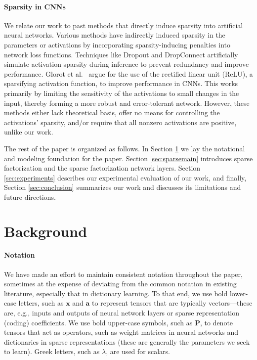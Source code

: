 \documentclass[10pt,twocolumn,letterpaper]{article}
\renewcommand{\vec}{\mathbf}
\newcommand{\x}{\vec{x}}
\renewcommand{\P}{\vec{P}}
\renewcommand{\a}{\vec{a}}
\begin{document}
\paragraph{Sparsity in CNNs}
%
We relate our work to past methods that directly induce sparsity into artificial neural networks.
%
Various methods \cite{SeNeurComp1997,NgICML2004,BoCuNIPS2008} have indirectly induced sparsity in the parameters or activations by incorporating sparsity-inducing penalties into network loss functions. Techniques like Dropout \cite{SrHiKrJMLR2014} and DropConnect \cite{WaZeZhICML2013} artificially simulate activation sparsity during inference to prevent redundancy and improve performance.
%
Glorot et al.~\cite{GlBoBeAIStats2011} argue for the use of the rectified linear unit (ReLU), a sparsifying activation function, to improve performance in CNNs. 
This works primarily by limiting the sensitivity of the activations to small changes in the input, thereby forming a more robust and error-tolerant network. However, these methods either lack theoretical basis, offer no means for controlling the activations' sparsity, and/or require that all nonzero activations are positive, unlike our work.
%

The rest of the paper is organized as follows.  In Section \ref{sec:background} we lay the notational and modeling foundation for the paper.  Section \ref{sec:sparsemain} introduces sparse factorization and the sparse factorization network layers.  Section \ref{sec:experiments} describes our experimental evaluation of our work, and finally, Section \ref{sec:conclusion} summarizes our work and discusses its limitations and future directions.

\section{Background}
\label{sec:background}

\paragraph{Notation}
%
We have made an effort to maintain consistent notation throughout the paper, sometimes at the expense of deviating from the common notation in existing literature, especially that in dictionary learning.  To that end, we use bold lower-case letters, such as $\x$ and $\a$ to represent tensors that are typically vectors---these are, e.g., inputs and outputs of neural network layers or sparse representation (coding) coefficients.  We use bold upper-case symbols, such as $\P$, to denote tensors that act as operators, such as weight matrices in neural networks and dictionaries in sparse representations (these are generally the parameters we seek to learn).  Greek letters, such as $\lambda$, are used for scalars.
\end{document}
